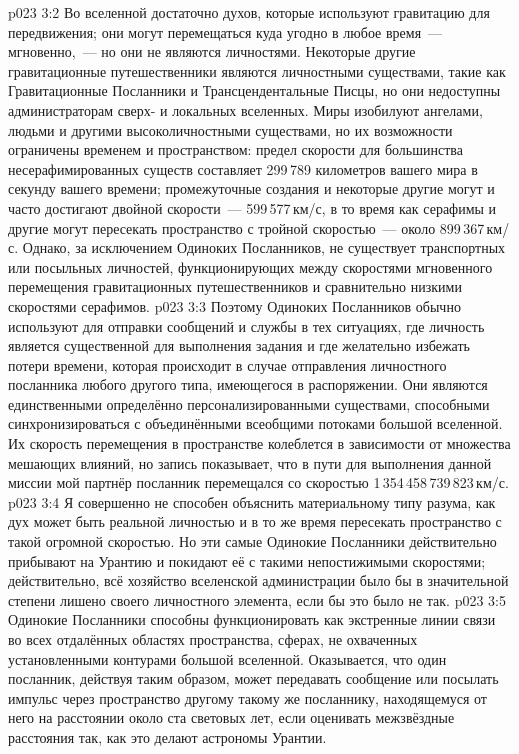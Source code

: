 \vs p023 3:2 \pc Во вселенной достаточно духов, которые используют гравитацию для передвижения; они могут перемещаться куда угодно в любое время~--- мгновенно,~--- но они не являются личностями. Некоторые другие гравитационные путешественники являются личностными существами, такие как Гравитационные Посланники и Трансцендентальные Писцы, но они недоступны администраторам сверх\hyp{} и локальных вселенных. Миры изобилуют ангелами, людьми и другими высоколичностными существами, но их возможности ограничены временем и пространством: предел скорости для большинства несерафимированных существ составляет 299\,789 километров вашего мира в секунду вашего времени; промежуточные создания и некоторые другие могут и часто достигают двойной скорости~--- 599\,577\,км/с, в то время как серафимы и другие могут пересекать пространство с тройной скоростью~--- около 899\,367\,км/с. Однако, за исключением Одиноких Посланников, не существует транспортных или посыльных личностей, функционирующих между скоростями мгновенного перемещения гравитационных путешественников и сравнительно низкими скоростями серафимов.
\vs p023 3:3 Поэтому Одиноких Посланников обычно используют для отправки сообщений и службы в тех ситуациях, где личность является существенной для выполнения задания и где желательно избежать потери времени, которая происходит в случае отправления личностного посланника любого другого типа, имеющегося в распоряжении. Они являются единственными определённо персонализированными существами, способными синхронизироваться с объединёнными всеобщими потоками большой вселенной. Их скорость перемещения в пространстве колеблется в зависимости от множества мешающих влияний, но запись показывает, что в пути для выполнения данной миссии мой партнёр посланник перемещался со скоростью 1\,354\,458\,739\,823\,км/с.
\vs p023 3:4 Я совершенно не способен объяснить материальному типу разума, как дух может быть реальной личностью и в то же время пересекать пространство с такой огромной скоростью. Но эти самые Одинокие Посланники действительно прибывают на Урантию и покидают её с такими непостижимыми скоростями; действительно, всё хозяйство вселенской администрации было бы в значительной степени лишено своего личностного элемента, если бы это было не так.
\vs p023 3:5 \pc Одинокие Посланники способны функционировать как экстренные линии связи во всех отдалённых областях пространства, сферах, не охваченных установленными контурами большой вселенной. Оказывается, что один посланник, действуя таким образом, может передавать сообщение или посылать импульс через пространство другому такому же посланнику, находящемуся от него на расстоянии около ста световых лет, если оценивать межзвёздные расстояния так, как это делают астрономы Урантии.
